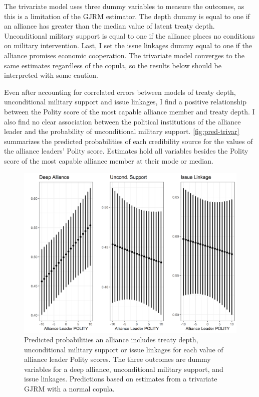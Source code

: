 \documentclass[12pt]{article}
\begin{document}
The trivariate model uses three dummy variables to measure the outcomes, as this is a limitation of the GJRM estimator. 
The depth dummy is equal to one if an alliance has greater than the median value of latent treaty depth. 
Unconditional military support is equal to one if the alliance places no conditions on military intervention. 
Last, I set the issue linkages dummy equal to one if the alliance promises economic cooperation. 
The trivariate model converges to the same estimates regardless of the copula, so the results below should be interpreted with some caution.


Even after accounting for correlated errors between models of treaty depth, unconditional military support and issue linkages, I find a positive relationship between the Polity score of the most capable alliance member and treaty depth. 
I also find no clear association between the political institutions of the alliance leader and the probability of unconditional military support. 
\autoref{fig:pred-trivar} summarizes the predicted probabilities of each credibility source for the values of the alliance leaders' Polity score. 
Estimates hold all variables besides the Polity score of the most capable alliance member at their mode or median.  


\begin{figure}
\includegraphics[width=.95\textwidth]{pred-trivar.png}  
\caption{Predicted probabilities an alliance includes treaty depth, unconditional military support or issue linkages for each value of alliance leader Polity scores. The three outcomes are dummy variables for a deep alliance, unconditional military support, and issue linkages. Predictions based on estimates from a trivariate GJRM with a normal copula.}
\label{fig:pred-trivar}
\end{figure}




\newpage

\singlespace
 
 
\end{document}

